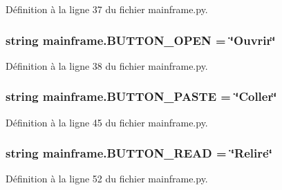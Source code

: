 Définition à la ligne 37 du fichier mainframe.\+py.

\hypertarget{namespacemainframe_a11d78a613c6ebc37d61aa0949a288686}{}
\subsubsection[{B\+U\+T\+T\+O\+N\+\_\+\+O\+P\+E\+N}]{\setlength{\rightskip}{0pt plus 5cm}string mainframe.\+B\+U\+T\+T\+O\+N\+\_\+\+O\+P\+E\+N = \char`\"{}Ouvrir\char`\"{}}\label{namespacemainframe_a11d78a613c6ebc37d61aa0949a288686}


Définition à la ligne 38 du fichier mainframe.\+py.

\hypertarget{namespacemainframe_a00380c1a1b21364ba7a90aa3869215b5}{}
\subsubsection[{B\+U\+T\+T\+O\+N\+\_\+\+P\+A\+S\+T\+E}]{\setlength{\rightskip}{0pt plus 5cm}string mainframe.\+B\+U\+T\+T\+O\+N\+\_\+\+P\+A\+S\+T\+E = \char`\"{}Coller\char`\"{}}\label{namespacemainframe_a00380c1a1b21364ba7a90aa3869215b5}


Définition à la ligne 45 du fichier mainframe.\+py.

\hypertarget{namespacemainframe_a1b771399895d0939a086acd3e3795389}{}
\subsubsection[{B\+U\+T\+T\+O\+N\+\_\+\+R\+E\+A\+D}]{\setlength{\rightskip}{0pt plus 5cm}string mainframe.\+B\+U\+T\+T\+O\+N\+\_\+\+R\+E\+A\+D = \char`\"{}Relire\char`\"{}}\label{namespacemainframe_a1b771399895d0939a086acd3e3795389}


Définition à la ligne 52 du fichier mainframe.\+py.

\hypertarget{namespacemainframe_a1245d15496e22d7e584dfc5519082b6e}{}
